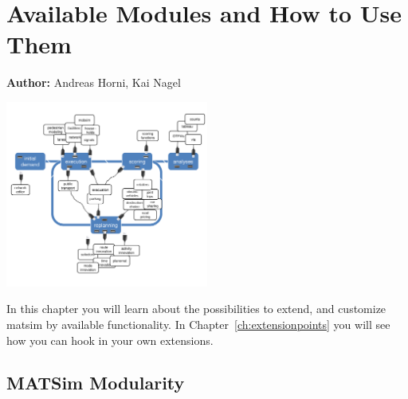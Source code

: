 \chapter{Available Modules and How to Use Them}
\label{ch:modules}

\hfill \textbf{Author:} Andreas Horni, Kai Nagel

\begin{center} \includegraphics[width=0.5\textwidth, angle=0]{extending/figures/modules.pdf} \end{center}

In this chapter you will learn about the possibilities to extend, and customize \gls{matsim} by available functionality. In Chapter~\ref{ch:extensionpoints} you will see how you can hook in your own extensions.


\section{MATSim Modularity}
\label{sec:matsim-modularity}

